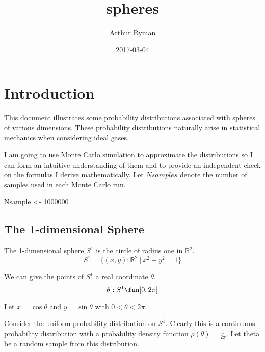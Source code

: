 \documentclass[]{article}
\title{spheres}
\author{Arthur Ryman}
\date{2017-03-04}
\newenvironment{Shaded}{\begin{snugshade}}{\end{snugshade}}
\newcommand{\DecValTok}[1]{\textcolor[rgb]{0.00,0.00,0.81}{{#1}}}
\newcommand{\StringTok}[1]{\textcolor[rgb]{0.31,0.60,0.02}{{#1}}}
\newcommand{\NormalTok}[1]{{#1}}
\begin{document}
\maketitle

\section{Introduction}\label{introduction}

This document illustrates some probability distributions associated with
spheres of various dimensions. These probability distributions naturally
arise in statistical mechanics when considering ideal gases.

I am going to use Monte Carlo simulation to approximate the
distributions so I can form an intuitive understanding of them and to
provide an independent check on the formulas I derive mathematically.
Let \(Nsamples\) denote the number of samples used in each Monte Carlo
run.

\begin{Shaded}
\begin{Highlighting}[]
\NormalTok{Nsample <-}\StringTok{ }\DecValTok{1000000}
\end{Highlighting}
\end{Shaded}

\subsection{The 1-dimensional Sphere}\label{the-1-dimensional-sphere}

The 1-dimensional sphere \(S^1\) is the circle of radius one in
\(\mathbb{R}^2\). \[
S^1 = \{ (x,y) : \mathbb{R}^2\ |\ x^2 + y^2 = 1 \}
\]

We can give the points of \(S^1\) a real coordinate \(\theta\). \[
\theta : S^1 \fun [0,2\pi]
\]

Let \(x = \cos \theta\) and \(y = \sin \theta\) with
\(0 < \theta < 2\pi\).

Consider the uniform probability distribution on \(S^1\). Clearly this
is a continuous probability distribution with a probability density
function \(\rho(\theta) = \frac{1}{2\pi}\). Let theta be a random sample
from this distribution.
\end{document}
